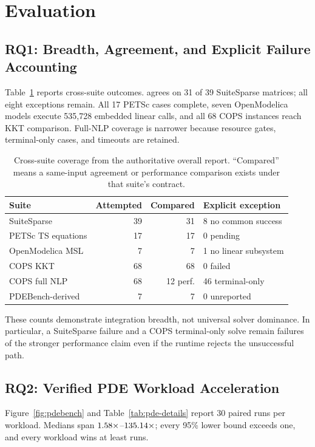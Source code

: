 \section{Evaluation}
\label{sec:evaluation}

\subsection{RQ1: Breadth, Agreement, and Explicit Failure Accounting}

Table~\ref{tab:coverage} reports cross-suite outcomes. \system agrees on 31 of 39
SuiteSparse matrices; all eight exceptions remain. All 17 PETSc cases complete,
seven OpenModelica models execute 535,728 embedded linear calls, and all 68 COPS
instances reach KKT comparison. Full-NLP coverage is narrower because resource
gates, terminal-only cases, and timeouts are retained.

\begin{table}[t]
\centering
\caption{Cross-suite coverage from the authoritative overall report. ``Compared''
means a same-input agreement or performance comparison exists under that suite's
contract.}
\label{tab:coverage}
\begin{tabular}{lrrl}
\toprule
Suite & Attempted & Compared & Explicit exception \\
\midrule
SuiteSparse & 39 & 31 & 8 no common success \\
PETSc TS equations & 17 & 17 & 0 pending \\
OpenModelica MSL & 7 & 7 & 1 no linear subsystem \\
COPS KKT & 68 & 68 & 0 failed \\
COPS full NLP & 68 & 12 perf. & 46 terminal-only \\
PDEBench-derived & 7 & 7 & 0 unreported \\
\bottomrule
\end{tabular}
\end{table}

These counts demonstrate integration breadth, not universal solver dominance. In
particular, a SuiteSparse failure and a COPS terminal-only solve remain failures of
the stronger performance claim even if the runtime rejects the unsuccessful path.

\subsection{RQ2: Verified PDE Workload Acceleration}

Figure~\ref{fig:pdebench} and Table~\ref{tab:pde-details} report 30 paired runs per
workload. Medians span $1.58\times$--$135.14\times$; every 95\%
lower bound exceeds one, and every workload wins at least \PdeMinimumRunWins{} runs.

